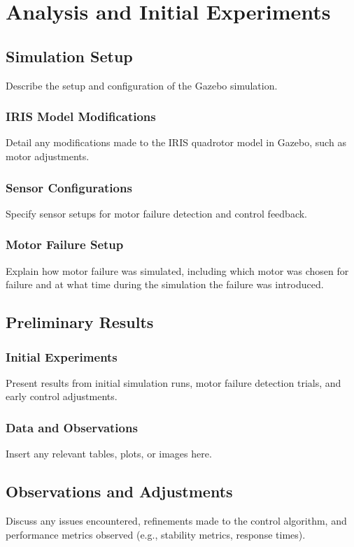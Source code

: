 \chapter{Analysis and Initial Experiments}

    \section{Simulation Setup}
    Describe the setup and configuration of the Gazebo simulation.

    \subsection{IRIS Model Modifications}
    Detail any modifications made to the IRIS quadrotor model in Gazebo, such as motor adjustments.

    \subsection{Sensor Configurations}
    Specify sensor setups for motor failure detection and control feedback.

    \subsection{Motor Failure Setup}
    Explain how motor failure was simulated, including which motor was chosen for failure and at what time during the simulation the failure was introduced.

    \section{Preliminary Results}
    \subsection{Initial Experiments}
    Present results from initial simulation runs, motor failure detection trials, and early control adjustments.

    \subsection{Data and Observations}
    Insert any relevant tables, plots, or images here.

    \section{Observations and Adjustments}
    Discuss any issues encountered, refinements made to the control algorithm, and performance metrics observed (e.g., stability metrics, response times).